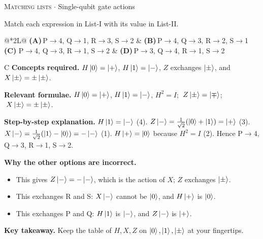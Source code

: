 \documentclass[11pt,a4paper]{article}
\newcommand{\optlabel}[1]{\textbf{(#1)}}
\newcommand{\correctlabel}[1]{\textcolor{okgreen}{\textbf{(#1)}\,\ding{51}}}
\newenvironment{qitem}[1]{\begin{list}{}{\setlength{\leftmargin}{3.3em}\setlength{\labelwidth}{3.1em}%
  \setlength{\labelsep}{0.2em}\setlength{\topsep}{3pt}\setlength{\parsep}{3pt}}\item[\textbf{Q.#1}\hfill]}{\end{list}}
\newcommand{\qsep}{\par\vspace{2pt}{\color{black!15}\hrule}\vspace{4pt}}
\newcommand{\qmeta}[2]{{\footnotesize\color{black!60}\textsc{#1} \;$\cdot$\; #2}\par}
\begin{document}
\begin{qitem}{35}
\qmeta{Matching lists}{Single-qubit gate actions}
Match each expression in List-I with its value in List-II.
\par\smallskip{}
\par\smallskip\noindent\begin{tabularx}{\linewidth}{@{}*{2}{L}@{}}
\optlabel{A}\,P$\to$4, Q$\to$1, R$\to$3, S$\to$2 & \optlabel{B}\,P$\to$4, Q$\to$3, R$\to$2, S$\to$1 \\[3pt]
\correctlabel{C}\,P$\to$4, Q$\to$3, R$\to$1, S$\to$2 & \optlabel{D}\,P$\to$3, Q$\to$4, R$\to$1, S$\to$2
\end{tabularx}
\end{qitem}
\begin{solbox}{C}
\textbf{\color{brand}Concepts required.} $H\ket0 = \ket{+}$, $H\ket1 = \ket{-}$, $Z$ exchanges $\ket{\pm}$, and $X\ket{\pm} = \pm\ket{\pm}$.

\textbf{\color{brand}Relevant formulae.} $H\ket0 = \ket{+}$, $H\ket1 = \ket{-}$, $H^2 = I$; $\;Z\ket\pm = \ket\mp$; $\;X\ket\pm = \pm\ket\pm$.

\textbf{\color{brand}Step-by-step explanation.} $H\ket1 = \ket{-}$ (4). $Z\ket{-} = \frac{1}{\sqrt2}(\ket0 + \ket1) = \ket{+}$ (3). $X\ket{-} = \frac{1}{\sqrt2}(\ket1 - \ket0) = -\ket{-}$ (1).
$H\ket{+} = \ket0$ because $H^2 = I$ (2). Hence P$\to$4, Q$\to$3, R$\to$1, S$\to$2.

\textbf{\color{brand}Why the other options are incorrect.}
\begin{itemize}[leftmargin=2.4em, itemsep=1pt, topsep=2pt]
\item[\textbf{(A)}] This gives $Z\ket{-} = -\ket{-}$, which is the action of $X$; $Z$ exchanges $\ket{\pm}$.
\item[\textbf{(B)}] This exchanges R and S: $X\ket{-}$ cannot be $\ket0$, and $H\ket{+}$ is $\ket0$.
\item[\textbf{(D)}] This exchanges P and Q: $H\ket1$ is $\ket{-}$, and $Z\ket{-}$ is $\ket{+}$.
\end{itemize}
\textbf{\color{brand}Key takeaway.} Keep the table of $H, X, Z$ on $\ket0, \ket1, \ket\pm$ at your fingertips.
\end{solbox}
\qsep
\end{document}
